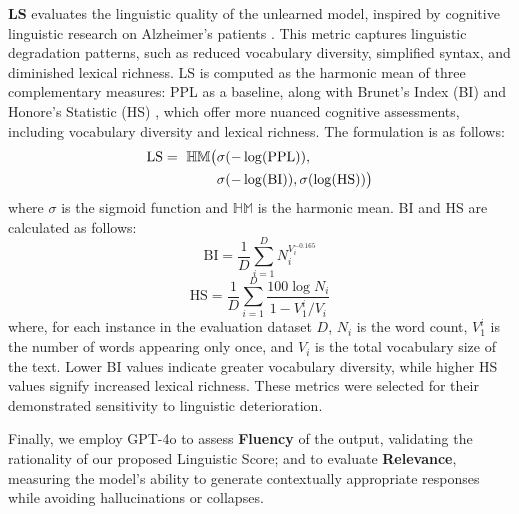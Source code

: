 \textbf{LS} evaluates the linguistic quality of the unlearned model, inspired by cognitive linguistic research on Alzheimer's patients \citep{fraser2016linguistic, heitz-etal-2024-influence}. 
This metric captures linguistic degradation patterns, such as reduced vocabulary diversity, simplified syntax, and diminished lexical richness. 
LS is computed as the harmonic mean of three complementary measures: 
PPL as a baseline, along with Brunet's Index (BI) \citep{brunet1978vocabulaire} and Honore's Statistic (HS) \citep{honore1979simple}, which offer more nuanced cognitive assessments, including vocabulary diversity and lexical richness.
The formulation is as follows: 
\begin{align}
\text{LS} = \  \mathbb{HM} \big ( & \sigma(-\log(\text{PPL})), \notag \\
& \sigma(-\log(\text{BI})), \sigma(\log(\text{HS})) \big )
\end{align}
where \(\sigma\) is the sigmoid function and $\mathbb{HM}$ is the harmonic mean. 
BI and HS are calculated as follows:
\vspace{-2ex}
\begin{equation}
\text{BI} = \frac{1}{D} \sum_{i=1}^{D}N_i^{V_i^{-0.165}}
\end{equation}
\vspace{-1ex}
\begin{equation}
\text{HS} = \frac{1}{D} \sum_{i=1}^{D} \frac{100 \log N_i}{1 - V_1^i/V_i}
\end{equation}
where, for each instance in the evaluation dataset \(D\), \(N_i\) is the word count, \(V_1^i\) is the number of words appearing only once, and \(V_i\) is the total vocabulary size of the text.
Lower BI values indicate greater vocabulary diversity, while higher HS values signify increased lexical richness.
These metrics were selected for their demonstrated sensitivity to linguistic deterioration.

Finally, we employ GPT-4o \citep{openai2024gpt4ocard} to assess \textbf{Fluency} of the output, validating the rationality of our proposed Linguistic Score; 
and to evaluate \textbf{Relevance}, measuring the model's ability to generate contextually appropriate responses while avoiding hallucinations or collapses.